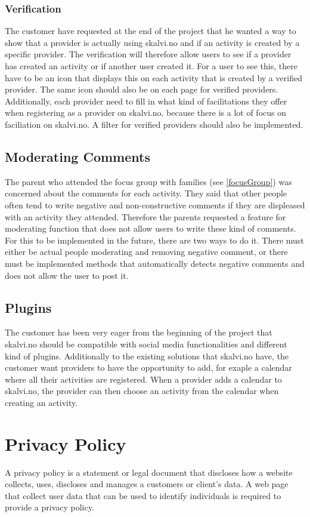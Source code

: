 \subsubsection{Verification}
The customer have requested at the end of the project that he wanted a way to show that a provider is actually using skalvi.no and if an activity is created by a specific provider. The verification will therefore allow users to see if a provider has created an activity or if another user created it. For a user to see this, there have to be an icon that displays this on each activity that is created by a verified provider. The same icon should also be on each page for verified providers. Additionally, each provider need to fill in what kind of facilitations they offer when registering as a provider on skalvi.no, because there is a lot of focus on faciliation on skalvi.no. A filter for verified providers should also be implemented.


\subsection{Moderating Comments}
The parent who attended the focus group with families (see \ref{focusGroup}) was concerned about the comments for each activity. They said that other people often tend to write negative and non-constructive comments if they are displeased with an activity they attended. Therefore the parents requested a feature for moderating function that does not allow users to write these kind of comments. For this to be implemented in the future, there are two ways to do it. There must either be actual people moderating and removing negative comment, or there must be implemented methods that automatically detects negative comments and does not allow the user to post it. 

\subsection{Plugins}
The customer has been very eager from the beginning of the project that skalvi.no should be compatible with social media functionalities and different kind of plugins. Additionally to the existing solutions that skalvi.no have, the customer want providers to have the opportunity to add, for exaple a calendar where all their activities are registered. When a provider adds a calendar to skalvi.no, the provider can then choose an activity from the calendar when creating an activity.

\section{Privacy Policy}
A privacy policy is a statement or legal document that discloses how a website collects, uses, discloses and manages a customers or client's data. A web page that collect user data that can be used to identify individuals is required to provide a privacy policy.

